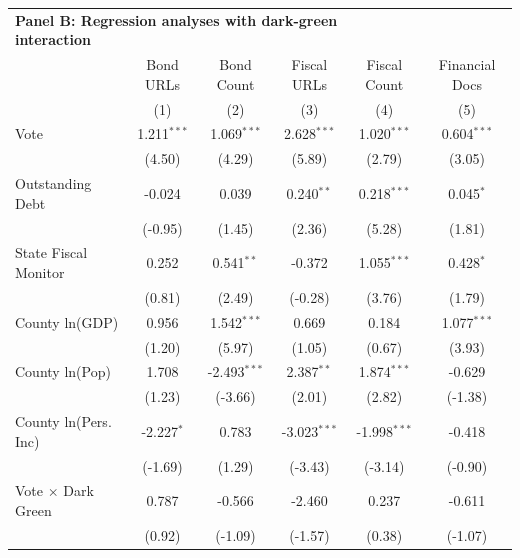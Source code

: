 \begingroup
\centering
\begin{tabular*}{\textwidth}{@{\extracolsep{\fill}}lccccc}
\multicolumn{5}{l}{\textbf{Panel B: Regression analyses with dark-green interaction}}\\

\addlinespace
   \toprule
                             & Bond URLs     & Bond Count     & Fiscal URLs    & Fiscal Count   & Financial Docs\\  
                             & (1)           & (2)            & (3)            & (4)            & (5)\\  
   \midrule 
   Vote                      & 1.211$^{***}$ & 1.069$^{***}$  & 2.628$^{***}$  & 1.020$^{***}$  & 0.604$^{***}$\\   
                             & (4.50)       & (4.29)        & (5.89)        & (2.79)        & (3.05)\\   
   Outstanding Debt          & -0.024        & 0.039          & 0.240$^{**}$   & 0.218$^{***}$  & 0.045$^{*}$\\   
                             & (-0.95)      & (1.45)        & (2.36)        & (5.28)        & (1.81)\\   
   State Fiscal Monitor      & 0.252         & 0.541$^{**}$   & -0.372         & 1.055$^{***}$  & 0.428$^{*}$\\   
                             & (0.81)       & (2.49)        & (-0.28)       & (3.76)        & (1.79)\\   
   County ln(GDP)            & 0.956         & 1.542$^{***}$  & 0.669          & 0.184          & 1.077$^{***}$\\   
                             & (1.20)       & (5.97)        & (1.05)        & (0.67)        & (3.93)\\   
   County ln(Pop)            & 1.708         & -2.493$^{***}$ & 2.387$^{**}$   & 1.874$^{***}$  & -0.629\\   
                             & (1.23)       & (-3.66)       & (2.01)        & (2.82)        & (-1.38)\\   
   County ln(Pers. Inc)      & -2.227$^{*}$  & 0.783          & -3.023$^{***}$ & -1.998$^{***}$ & -0.418\\   
                             & (-1.69)      & (1.29)        & (-3.43)       & (-3.14)       & (-0.90)\\   
   Vote $\times$ Dark Green  & 0.787         & -0.566         & -2.460         & 0.237          & -0.611\\   
                             & (0.92)       & (-1.09)       & (-1.57)       & (0.38)        & (-1.07)\\   

\end{tabular*}

